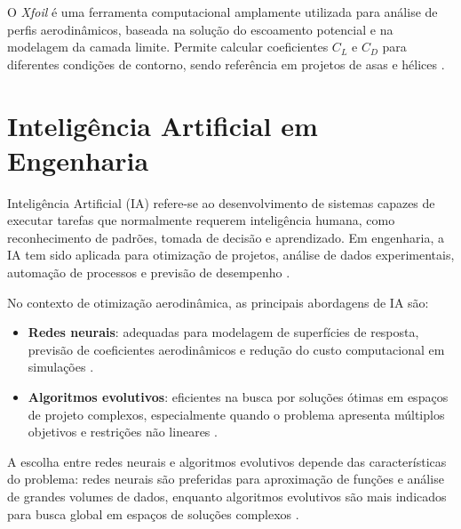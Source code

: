 O \textit{Xfoil} é uma ferramenta computacional amplamente utilizada para análise de perfis aerodinâmicos, baseada na solução do escoamento potencial e na modelagem da camada limite. Permite calcular coeficientes \(C_L\) e \(C_D\) para diferentes condições de contorno, sendo referência em projetos de asas e hélices \cite{drela1989xfoil}.

\section{Inteligência Artificial em Engenharia}
Inteligência Artificial (IA) refere-se ao desenvolvimento de sistemas capazes de executar tarefas que normalmente requerem inteligência humana, como reconhecimento de padrões, tomada de decisão e aprendizado. Em engenharia, a IA tem sido aplicada para otimização de projetos, análise de dados experimentais, automação de processos e previsão de desempenho \cite{goodfellow2016deep}.

No contexto de otimização aerodinâmica, as principais abordagens de IA são:

\begin{itemize}
    \item \textbf{Redes neurais}: adequadas para modelagem de superfícies de resposta, previsão de coeficientes aerodinâmicos e redução do custo computacional em simulações \cite{goodfellow2016deep}.
    \item \textbf{Algoritmos evolutivos}: eficientes na busca por soluções ótimas em espaços de projeto complexos, especialmente quando o problema apresenta múltiplos objetivos e restrições não lineares \cite{back1996evolutionary}.
\end{itemize}

A escolha entre redes neurais e algoritmos evolutivos depende das características do problema: redes neurais são preferidas para aproximação de funções e análise de grandes volumes de dados, enquanto algoritmos evolutivos são mais indicados para busca global em espaços de soluções complexos \cite{goldberg1989genetic}.